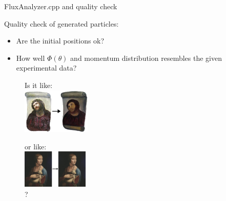 \documentclass{beamer}
\begin{document}
\begin{frame}{FluxAnalyzer.cpp and quality check}

Quality check of generated particles:
	\begin{itemize}
	\item Are the initial positions ok?
	\item How well $\Phi(\theta)$ and momentum distribution resembles the given experimental data?
	\end {itemize}
\begin{figure}Is it like:\\
\includegraphics[width=0.29\textwidth]{images/Ecce_Homo.jpg}
\end{figure}
\begin{figure}
or like:\\
\includegraphics[width=0.28\textwidth]{images/Lady_with_an_Ermine.jpg}\\?
\end{figure}	
\end{frame}
\end{document}
